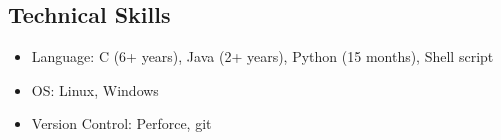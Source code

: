 \documentclass[margin,line]{res}
\begin{document}
\begin{resume}
\section{\sc Technical Skills} 
\begin{itemize}
\item Language: C (6+ years), Java (2+ years), Python (15 months), Shell script
\item OS: Linux, Windows
\item Version Control: Perforce, git
\end{itemize}


\end{resume}
\end{document}

